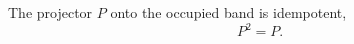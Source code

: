\documentclass{article}
\begin{document}
The projector $P$ onto the occupied band is idempotent,
\begin{equation}
P^2 = P .
\label{eq:p}
\end{equation}
\end{document}
